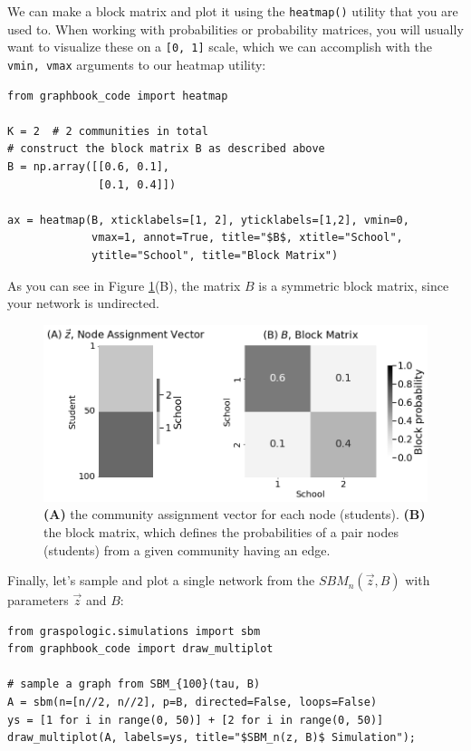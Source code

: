 We can make a block matrix and plot it using the \texttt{heatmap()} utility that you are used to. When working with probabilities or probability matrices, you will usually want to visualize these on a \texttt{[0, 1]} scale, which we can accomplish with the \texttt{vmin, vmax} arguments to our heatmap utility:

\begin{lstlisting}[style=python]
from graphbook_code import heatmap

K = 2  # 2 communities in total
# construct the block matrix B as described above
B = np.array([[0.6, 0.1], 
              [0.1, 0.4]])

ax = heatmap(B, xticklabels=[1, 2], yticklabels=[1,2], vmin=0, 
             vmax=1, annot=True, title="$B$, xtitle="School",
             ytitle="School", title="Block Matrix")
\end{lstlisting}

As you can see in Figure \ref{fig:ch5:sbm}(B), the matrix $B$ is a symmetric block matrix, since your network is undirected. 

\begin{figure}
    \centering
    \includegraphics[width=\linewidth]{representations/ch5/Images/sbm.png}
    \caption[Parameters for a stochastic block model]{\textbf{(A)} the community assignment vector for each node (students). \textbf{(B)} the block matrix, which defines the probabilities of a pair nodes (students) from a given community having an edge.}
    \label{fig:ch5:sbm}
\end{figure}

Finally, let's sample and plot a single network from the $SBM_n(\vec z, B)$ with parameters $\vec z$ and $B$:

\begin{lstlisting}[style=python]
from graspologic.simulations import sbm
from graphbook_code import draw_multiplot

# sample a graph from SBM_{100}(tau, B)
A = sbm(n=[n//2, n//2], p=B, directed=False, loops=False)
ys = [1 for i in range(0, 50)] + [2 for i in range(0, 50)]
draw_multiplot(A, labels=ys, title="$SBM_n(z, B)$ Simulation");
\end{lstlisting}

